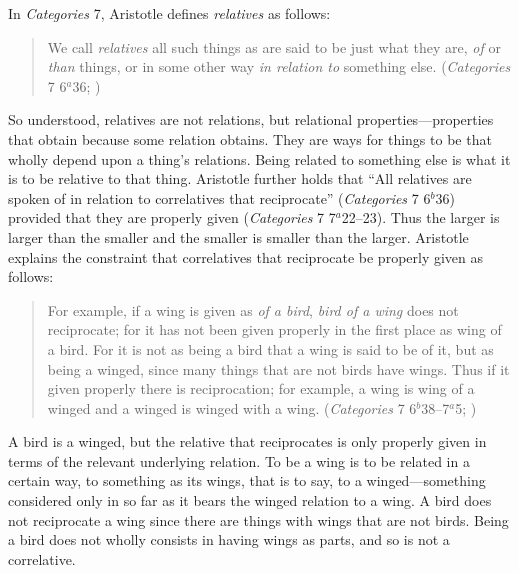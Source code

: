In \emph{Categories} 7, Aristotle defines \emph{relatives} as follows:
\begin{quote}
    We call \emph{relatives} all such things as are said to be just what they are, \emph{of} or \emph{than} things, or in some other way \emph{in relation to} something else. (\emph{Categories} 7 6\( ^{a} \)36; \citealt{Ackrill:1963fk})
\end{quote}
So understood, relatives are not relations, but relational properties---properties that obtain because some relation obtains. They are ways for things to be that wholly depend upon a thing's relations. Being related to something else is what it is to be relative to that thing. Aristotle further holds that ``All relatives are spoken of in relation to correlatives that reciprocate'' (\emph{Categories} 7 6\( ^{b} \)36) provided that they are properly given (\emph{Categories} 7 7\( ^{a} \)22--23). Thus the larger is larger than the smaller and the smaller is smaller than the larger. Aristotle explains the constraint that correlatives that reciprocate be properly given as follows:
\begin{quote}
    For example, if a wing is given as \emph{of a bird}, \emph{bird of a wing} does not reciprocate; for it has not been given properly in the first place as wing of a bird. For it is not as being a bird that a wing is said to be of it, but as being a winged, since many things that are not birds have wings. Thus if it given properly there is reciprocation; for example, a wing is wing of a winged and a winged is winged with a wing. (\emph{Categories} 7 6\( ^{b} \)38--7\( ^{a} \)5; \citealt{Ackrill:1963fk})
\end{quote}
A bird is a winged, but the relative that reciprocates is only properly given in terms of the relevant underlying relation. To be a wing is to be related in a certain way, to something as its wings, that is to say, to a winged---something considered only in so far as it bears the winged relation to a wing. A bird does not reciprocate a wing since there are things with wings that are not birds. Being a bird does not wholly consists in having wings as parts, and so is not a correlative.

